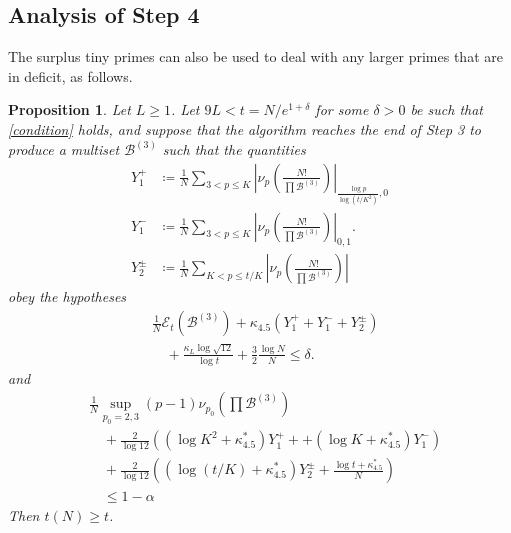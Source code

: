 \documentclass[12pt,a4paper,reqno]{amsart}
\numberwithin{equation}{section}
\theoremstyle{plain}
\newtheorem{proposition}[theorem]{Proposition}
\theoremstyle{definition}
\newcommand\tuple{{\mathcal B}}
\newcommand\excess{{\mathcal{E}}}
\begin{document}
\subsection{Analysis of Step 4}

The surplus tiny primes can also be used to deal with any larger primes that are in deficit, as follows.

\begin{proposition}\label{step4-reduce}  Let $L \geq 1$.  Let $9L < t = N/e^{1+\delta}$ for some $\delta>0$ be such that \eqref{condition} holds, and suppose that the algorithm reaches the end of Step 3 to produce a multiset $\tuple^{(3)}$ such that the quantities
  \begin{align}
    Y_1^+ &\coloneqq \frac{1}{N} \sum_{3 < p \leq K} \left|\nu_p\left(\frac{N!}{\prod \tuple^{(3)}}\right)\right|_{\frac{\log p}{\log (t/K^2)},0}  \label{y1p-def}\\
    Y_1^- &\coloneqq \frac{1}{N} \sum_{3 < p \leq K} \left|\nu_p\left(\frac{N!}{\prod \tuple^{(3)}}\right)\right|_{0,1}.\label{y1m-def} \\
    Y^\pm_2 &\coloneqq \frac{1}{N} \sum_{K < p \leq t/K} \left|\nu_p\left(\frac{N!}{\prod \tuple^{(3)}}\right)\right|\label{y2pm-def}
  \end{align}
    obey the hypotheses
\begin{equation}\label{new-balance-5}
    \begin{split}
&     \frac{1}{N} \excess_t(\tuple^{(3)}) + \kappa_{4.5} (Y_1^+ + Y_1^- + Y_2^\pm)\\
&\quad + \frac{\kappa_L \log \sqrt{12}}{\log t} + \frac{3}{2} \frac{\log N}{N}  \leq \delta.
    \end{split}
  \end{equation}
and
  \begin{equation}\label{nstarb}
    \begin{split}
&\frac{1}{N} \sup_{p_0=2,3} (p-1) \nu_{p_0}\left(\prod \tuple^{(3)}\right) \\
&\quad + \frac{2}{\log 12} \left( (\log K^2 +\kappa^*_{4.5}) Y_1^+ + + (\log K + \kappa^*_{4.5}) Y_1^- \right) \\
&\quad + \frac{2}{\log 12}  \left( (\log(t/K) +\kappa^*_{4.5}) Y_2^\pm + \frac{\log t + \kappa^*_{4.5}}{N}  \right)
\\
  &\quad  \leq 1-\alpha
  \end{split}
\end{equation}
     Then $t(N) \geq t$.
\end{proposition}
\end{document}

